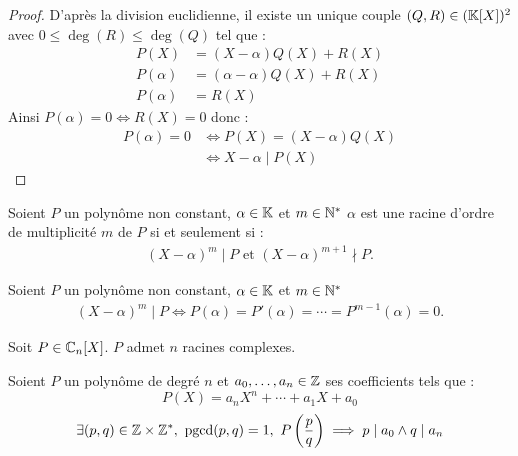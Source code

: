 \begin{proof}
	D'après la division euclidienne, il existe un unique couple $(Q, R) \in (\mathbb{K}[X])^2$ avec $0 \leq \deg(R) \leq \deg(Q)$ tel que :
	\begin{align*}
		P(X) &= (X - \alpha) Q(X) + R(X) \\
		P(\alpha) &= (\alpha - \alpha) Q(X) + R(X) \\
		P(\alpha) &= R(X)
	\end{align*}
	Ainsi $P(\alpha) = 0 \iff R(X) = 0$ donc :
	\begin{align*}
		P(\alpha) = 0 &\iff P(X) = (X - \alpha) Q(X) \\
					  &\iff X - \alpha \mid P(X)
	\end{align*}
\end{proof}

\begin{definition}\label{def:ordre_mult}
	Soient $P$ un polynôme non constant, $\alpha \in \mathbb{K}$ et $m \in \mathbb{N}^*$ $\alpha$ est une racine d'ordre de multiplicité $m$ de $P$ si et seulement si :
	\begin{align*}
		(X - \alpha)^m \mid P \text{ et } (X - \alpha)^{m+1} \nmid P.
	\end{align*}
\end{definition}

\begin{theorem}
	Soient $P$ un polynôme non constant, $\alpha \in \mathbb{K}$ et $m \in \mathbb{N}^*$
	\begin{align*}
		(X - \alpha)^m \mid P \iff P(\alpha) = P'(\alpha) = \cdots = P^{m-1}(\alpha) = 0.
	\end{align*}
\end{theorem}

\begin{theorem}
	Soit $P \in \mathbb{C}_n[X]$. $P$ admet $n$ racines complexes. 
\end{theorem}

\begin{theorem}
	Soient $P$ un polynôme de degré $n$ et $a_0, \ldots, a_n \in \mathbb{Z}$ ses coefficients tels que :
	\[ P(X) = a_n X^n + \cdots + a_1 X + a_0 \]
	\[ \exists (p, q) \in \Z \times \Z^*,\ \pgcd(p, q) = 1,\ P\left( \frac{p}{q} \right) \implies p \mid a_0 \land q \mid a_n \]
\end{theorem}

